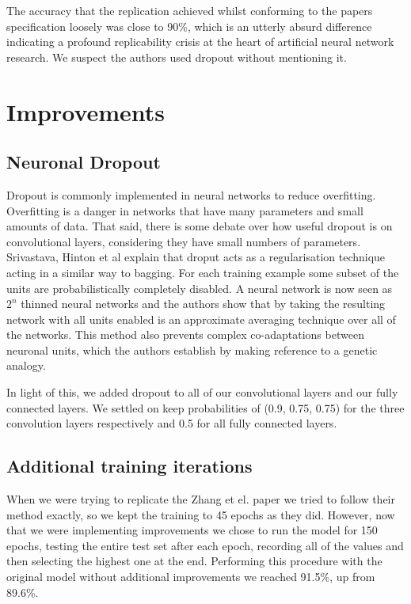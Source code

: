 \documentclass[conference]{IEEEtran}
\begin{document}
The accuracy that the replication achieved whilst conforming to the papers specification loosely was close to 90\%, which is an utterly absurd difference indicating a profound replicability crisis at the heart of artificial neural network research. We suspect the authors used dropout without mentioning it.

\section{Improvements}

\subsection{Neuronal Dropout}

Dropout is commonly implemented in neural networks to reduce overfitting. Overfitting is a danger in networks that have many parameters and small amounts of data. That said, there is some debate over how useful dropout is on convolutional layers, considering they have small numbers of parameters. Srivastava, Hinton et al\cite{Dropout_Paper} explain that droput acts as a regularisation technique acting in a similar way to bagging. For each training example some subset of the units are probabilistically completely disabled. A neural network is now seen as $2^{n}$ thinned neural networks and the authors show that by taking the resulting network with all units enabled is an approximate averaging technique over all of the networks. This method also prevents complex co-adaptations between neuronal units, which the authors establish by making reference to a genetic analogy.

In light of this, we added dropout to all of our convolutional layers and our fully connected layers. We settled on keep probabilities of (0.9, 0.75, 0.75) for the three convolution layers respectively and 0.5 for all fully connected layers.

\subsection{Additional training iterations}

When we were trying to replicate the Zhang et el. paper we tried to follow their method exactly, so we kept the training to 45 epochs as they did. However, now that we were implementing improvements we chose to run the model for 150 epochs, testing the entire test set after each epoch, recording all of the values and then selecting the highest one at the end. Performing this procedure with the original model without additional improvements we reached 91.5\%, up from 89.6\%.
\end{document}
